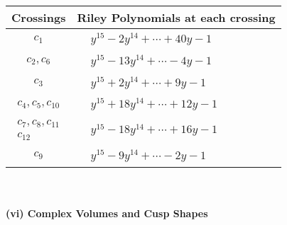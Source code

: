 \documentclass[1p]{elsarticle_modified}
\theoremstyle{definition}
\begin{document}
\begin{tabular}{m{50pt}|m{274pt}}
Crossings & \hspace{64pt}Riley Polynomials at each crossing \\
\hline $$\begin{aligned}c_{1}\end{aligned}$$&$\begin{aligned}
&y^{15}-2 y^{14}+\cdots+40 y-1
\end{aligned}$\\
\hline $$\begin{aligned}c_{2},c_{6}\end{aligned}$$&$\begin{aligned}
&y^{15}-13 y^{14}+\cdots-4 y-1
\end{aligned}$\\
\hline $$\begin{aligned}c_{3}\end{aligned}$$&$\begin{aligned}
&y^{15}+2 y^{14}+\cdots+9 y-1
\end{aligned}$\\
\hline $$\begin{aligned}c_{4},c_{5},c_{10}\end{aligned}$$&$\begin{aligned}
&y^{15}+18 y^{14}+\cdots+12 y-1
\end{aligned}$\\
\hline $$\begin{aligned}c_{7},c_{8},c_{11}\\c_{12}\end{aligned}$$&$\begin{aligned}
&y^{15}-18 y^{14}+\cdots+16 y-1
\end{aligned}$\\
\hline $$\begin{aligned}c_{9}\end{aligned}$$&$\begin{aligned}
&y^{15}-9 y^{14}+\cdots-2 y-1
\end{aligned}$\\
\hline
\end{tabular}\\~\\
\newpage\flushleft \textbf{(vi) Complex Volumes and Cusp Shapes}
\end{document}
